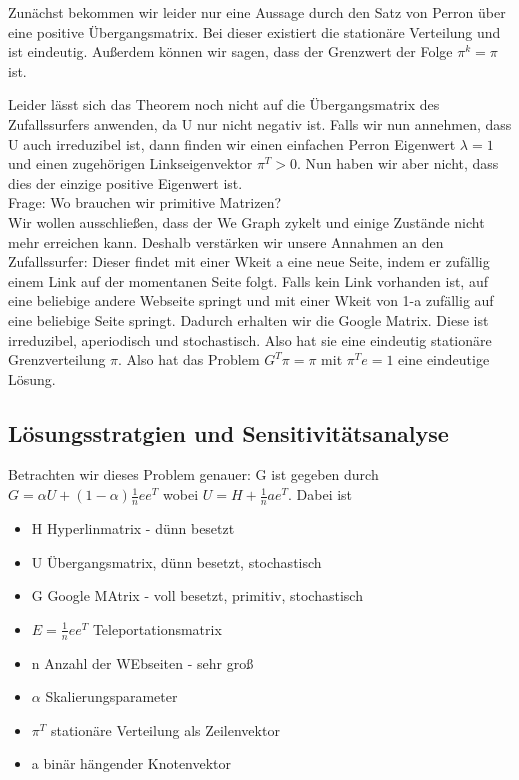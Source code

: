 \documentclass[]{article}
\begin{document}
Zunächst bekommen wir leider nur eine Aussage durch den Satz von Perron über eine positive Übergangsmatrix. Bei dieser existiert die stationäre Verteilung und ist eindeutig. Außerdem können wir sagen, dass der Grenzwert der Folge $\pi^k=\pi$ ist. 

Leider lässt sich das Theorem noch nicht auf die Übergangsmatrix des Zufallssurfers anwenden, da U nur nicht negativ ist. Falls wir nun annehmen, dass U auch irreduzibel ist, dann finden wir einen einfachen Perron Eigenwert $\lambda = 1$ und einen zugehörigen Linkseigenvektor $\pi^T>0$. Nun haben wir aber nicht, dass dies der einzige positive Eigenwert ist. \\

Frage: Wo brauchen wir primitive Matrizen? \\
  
Wir wollen ausschließen, dass der We Graph zykelt und einige Zustände nicht mehr erreichen kann. Deshalb verstärken wir unsere Annahmen an den Zufallssurfer: Dieser findet mit einer Wkeit a eine neue Seite, indem er zufällig einem Link auf der momentanen Seite folgt. Falls kein Link vorhanden ist, auf eine beliebige andere Webseite springt und mit einer Wkeit von 1-a zufällig auf eine beliebige Seite springt. Dadurch erhalten wir die Google Matrix. Diese ist irreduzibel, aperiodisch und stochastisch. Also hat sie eine eindeutig stationäre Grenzverteilung $\pi$. Also hat das Problem $G^T \pi = \pi$ mit $\pi^Te = 1$ eine eindeutige Lösung.    
 
 \subsection{Lösungsstratgien und Sensitivitätsanalyse}   
 
Betrachten wir dieses Problem genauer: G ist gegeben durch $G= \alpha U + (1 - \alpha ) \frac{1}{n} e e^T$ wobei $U=H+\frac{1}{n}a e^T$. Dabei ist 
\begin{itemize}
	\item H Hyperlinmatrix - dünn besetzt
	\item U Übergangsmatrix, dünn besetzt, stochastisch
	\item G Google MAtrix - voll besetzt, primitiv, stochastisch
	\item $E=\frac{1}{n}ee^T$ Teleportationsmatrix
	\item n Anzahl der WEbseiten - sehr groß
	\item $\alpha$ Skalierungsparameter
	\item $\pi^T$ stationäre Verteilung als Zeilenvektor
	\item a binär hängender Knotenvektor
\end{itemize}
\end{document}
